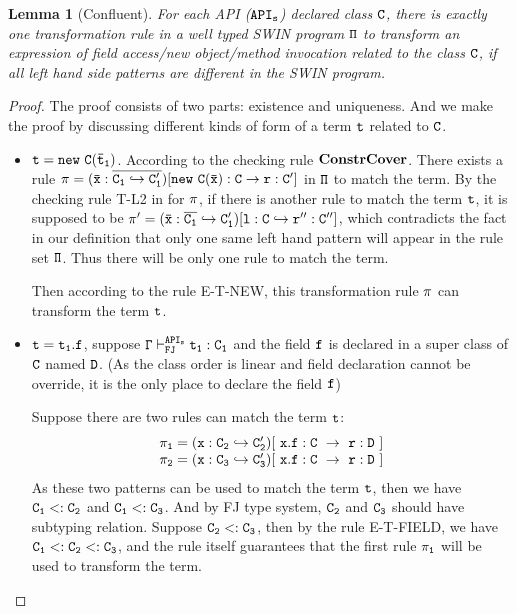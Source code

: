 \documentclass[letterpaper]{article}
\newcommand{\env}[2]{\vdash_{#1}^{#2}}
\newtheorem{lemma}{Lemma}
\begin{document}
\begin{lemma}[Confluent]
For each API ($\tt API_s$) declared class $\tt C$, there is exactly one transformation rule in a well typed SWIN program $\tt \Pi$ to transform an expression of field access/new object/method invocation related to the class $\tt C$, if all left hand side patterns are different in the SWIN program.
\end{lemma}
\begin{proof}
The proof consists of two parts: existence and uniqueness. And we make the proof by discussing different kinds of form of a term $\tt t$ related to $\tt C$.

\begin{itemize}
  \item $\tt t=new~C(\bar{t}_1)$. According to the checking rule $\tt \mathbf{ConstrCover}$. There exists a rule $\tt \pi = (\bar{x}:\overline{C_1\hookrightarrow C'_1})[new~C(\bar{x}):C \rightarrow r:C']$ in $\tt \Pi$ to match the term. By the checking rule T-L2 in for $\tt \pi$, if there is another rule to match the term $\tt t$, it is supposed to be $\tt \pi'=(\bar{x}:\overline{C_1}\hookrightarrow C'_1)[l:C \hookrightarrow r'':C'']$, which contradicts the fact in our definition that only one same left hand pattern will appear in the rule set $\tt\Pi$. Thus there will be only one rule to match the term.
  
  Then according to the rule E-T-NEW, this transformation rule $\tt\pi$ can transform the term $\tt t$.

  \item $\tt t=t_1.f$, suppose $\tt\Gamma\env{FJ}{API_s} t_1:C_1$ and the field $\tt f$ is declared in a super class of $\tt C$ named $\tt D$. (As the class order is linear and field declaration cannot be override, it is the only place to declare the field $\tt f$)

  Suppose there are two rules can match the term $\tt t$:
  \[
    \begin{array}{c}
      \tt \pi_1=(x:C_2\hookrightarrow C'_2)[~x.f:C\ \rightarrow\ r:D~] \\
      \tt \pi_2=(x:C_3\hookrightarrow C'_3)[~x.f:C\ \rightarrow\ r:D~]
    \end{array}
  \]
  As these two patterns can be used to match the term $\tt t$, then we have $\tt C_1 <: C_2$ and $\tt C_1 <: C_3$. And by FJ type system, $\tt C_2$ and $\tt C_3$ should have subtyping relation. Suppose $\tt C_2 <: C_3$, then by the rule E-T-FIELD, we have $\tt C_1<:C_2<:C_3$, and the rule itself guarantees that the first rule $\tt\pi_1$ will be used to transform the term.


\end{itemize}
\end{proof}
\end{document}
